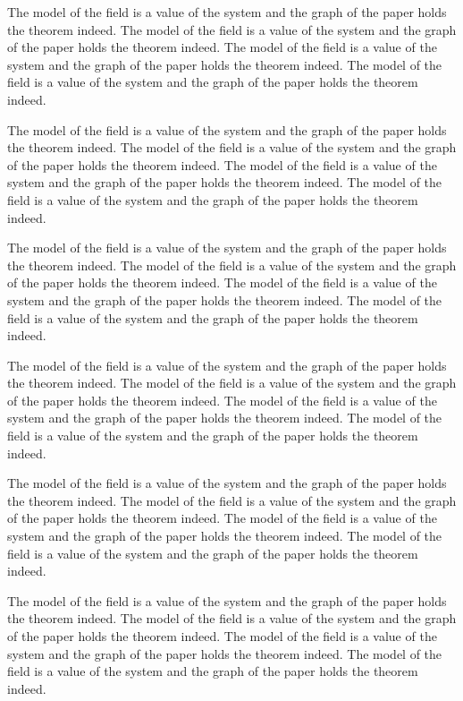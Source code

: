 \documentclass{article}
\begin{document}

The model of the field is a value of the system and the graph of the paper holds the theorem indeed. The model of the field is a value of the system and the graph of the paper holds the theorem indeed. The model of the field is a value of the system and the graph of the paper holds the theorem indeed. The model of the field is a value of the system and the graph of the paper holds the theorem indeed.

The model of the field is a value of the system and the graph of the paper holds the theorem indeed. The model of the field is a value of the system and the graph of the paper holds the theorem indeed. The model of the field is a value of the system and the graph of the paper holds the theorem indeed. The model of the field is a value of the system and the graph of the paper holds the theorem indeed.


The model of the field is a value of the system and the graph of the paper holds the theorem indeed. The model of the field is a value of the system and the graph of the paper holds the theorem indeed. The model of the field is a value of the system and the graph of the paper holds the theorem indeed. The model of the field is a value of the system and the graph of the paper holds the theorem indeed.

The model of the field is a value of the system and the graph of the paper holds the theorem indeed. The model of the field is a value of the system and the graph of the paper holds the theorem indeed. The model of the field is a value of the system and the graph of the paper holds the theorem indeed. The model of the field is a value of the system and the graph of the paper holds the theorem indeed.

The model of the field is a value of the system and the graph of the paper holds the theorem indeed. The model of the field is a value of the system and the graph of the paper holds the theorem indeed. The model of the field is a value of the system and the graph of the paper holds the theorem indeed. The model of the field is a value of the system and the graph of the paper holds the theorem indeed.

The model of the field is a value of the system and the graph of the paper holds the theorem indeed. The model of the field is a value of the system and the graph of the paper holds the theorem indeed. The model of the field is a value of the system and the graph of the paper holds the theorem indeed. The model of the field is a value of the system and the graph of the paper holds the theorem indeed.
\end{document}
